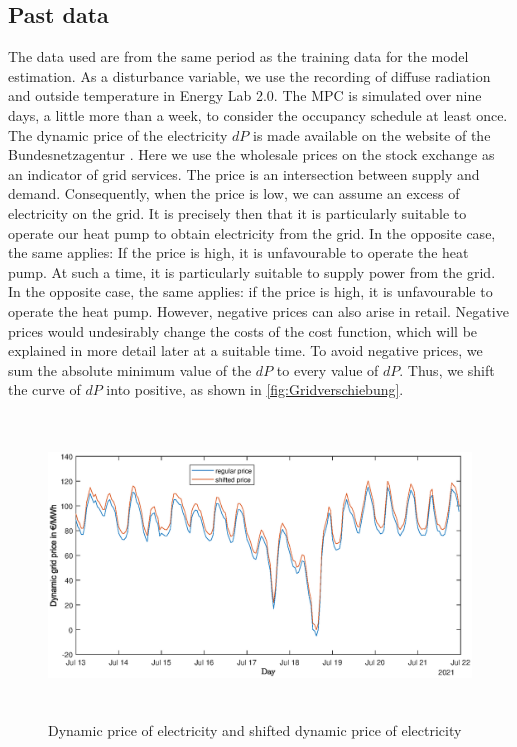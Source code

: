 \subsection{Past data}
\label{subsec:PastData}
    The data used are from the same period as the training data for the model estimation. As a disturbance variable, we use the recording of diffuse radiation and outside temperature in Energy Lab 2.0. The MPC is simulated over nine days, a little more than a week, to consider the occupancy schedule at least  once.\newline
    The dynamic price of the electricity  $dP$ is made available on the website of the Bundesnetzagentur \cite{Bundesnetzagentur-smard}. Here we use the wholesale prices on the stock exchange as an indicator of grid services. The price is an intersection between supply and demand. Consequently, when the price is low, we can assume an excess of electricity on the grid. It is precisely then that it is particularly suitable to operate our heat pump to obtain electricity from the grid. In the opposite case, the same applies: If the price is high, it is unfavourable to operate the heat pump. At such a time, it is particularly suitable to supply power from the grid. In the opposite case, the same applies: if the price is high, it is unfavourable to operate the heat pump. \newline
    However, negative prices can also arise in retail. Negative prices would undesirably change the costs of the cost function, which will be explained in more detail later at a suitable time. To avoid negative prices, we sum the absolute minimum value of the $dP$ to every value of $dP$. Thus, we shift the curve of $dP$ into positive, as shown in \autoref{fig:Gridverschiebung}.
    \begin{figure}[h]
            \centering
            \includegraphics[width=15cm,height=8cm]{figure/Grid_data_Verschiebung.eps}
           \caption{Dynamic price of electricity \cite{Bundesnetzagentur-smard} and shifted dynamic price of electricity}
            \label{fig:Gridverschiebung}
    \end{figure}
    
